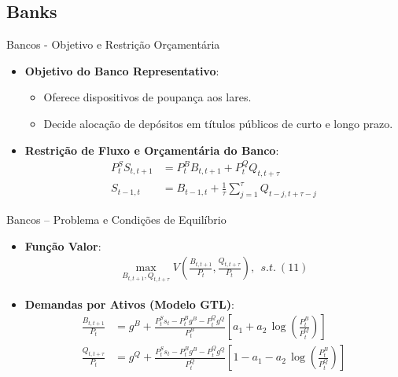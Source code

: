 \documentclass{beamer}
\begin{document}
\subsection{Banks}

\begin{frame}{Bancos - Objetivo e Restrição Orçamentária}
    \begin{itemize}
        \item \textbf{Objetivo do Banco Representativo}:
        \begin{itemize}
            \item Oferece dispositivos de poupança aos lares.
            \item Decide alocação de depósitos em títulos públicos de curto e longo prazo.
        \end{itemize}
        \item \textbf{Restrição de Fluxo e Orçamentária do Banco}:
        \begin{align*}
            P^S_tS_{t,t+1} &= P^B_tB_{t,t+1} + P^Q_tQ_{t,t+\tau} \tag{11}\\
            S_{t-1,t} &= B_{t-1,t} + \frac{1}{\tau}\sum_{j=1}^\tau Q_{t-j,t+\tau-j} \tag{14}
        \end{align*}
    \end{itemize}
\end{frame}

\begin{frame}{Bancos -- Problema e Condições de Equilíbrio}
    \begin{itemize}
        \item \textbf{Função Valor}:
        \begin{align*}
            \max_{B_{t,t+1},Q_{t,t+\tau}}V\left({\frac{B_{t,t+1}}{P_{t}}},{\frac{Q_{t,t+\tau}}{P_{t}}}\right), ~~ s.t. ~ (11)
        \end{align*}
        \item \textbf{Demandas por Ativos (Modelo GTL)}:
        \begin{align*}
            \frac{B_{t,t+1}}{P_{t}} &= g^{B}\!+\!\frac{P_{t}^{S}s_{t}\!-\!P_{t}^{B}g^{B}\!-\!P_{t}^{Q}g^{Q}}{P_{t}^{B}}\!\left[\!a_{1}\!+\!a_{2}\,\log\left(\!\frac{P_{t}^{B}}{P_{t}^{Q}}\right)\!\right] \tag{12}\\
            \frac{Q_{t,t+\tau}}{P_{t}}\!&=\!g^{Q}\!+\!\frac{P_{t}^{S}\!s_{t}\!-\!P_{t}^{B}\!g^{B}\!-\!P_{t}^{Q}g^{Q}}{P_{t}^{Q}}\!\left[1\!-\!a_{1}\!-\!a_{2}\,\log\left(\!\frac{P_{t}^{B}}{P_{t}^{Q}}\right)\right] \tag{13}
        \end{align*}
    \end{itemize}
\end{frame}
\end{document}

